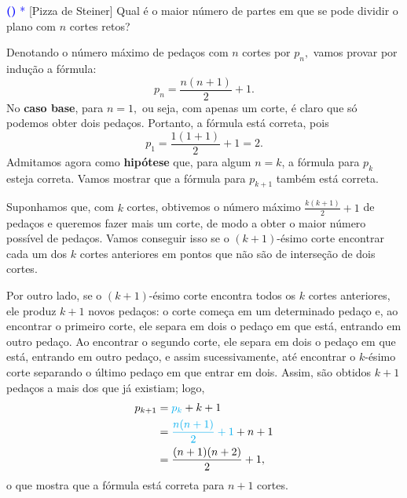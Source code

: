 \documentclass[12pt, a4paper]{article}
\newcounter{exercicio}[section]
\newenvironment{exercicio}[1][]{\refstepcounter{exercicio}\par\medskip
 \textcolor{blue}{\bf(\theexercicio)} \rmfamily}{\medskip }
\begin{document}
\begin{exercicio}\textcolor{Blue}{*} \textsf{[Pizza de Steiner]}
Qual é o maior número de partes em que se pode dividir o plano com $n$ cortes retos?
\end{exercicio}
\begin{solution}
Denotando o número máximo de pedaços com $n$ cortes por $p_n,$
vamos provar por indução a fórmula:
\[
p_n = \dfrac{n(n+1)}{2} + 1.
\]
No \textbf{caso base}, para $n = 1,$ ou seja, com apenas um corte, é claro que só podemos
obter dois pedaços. Portanto, a fórmula está correta, pois
\[
p_1 = \dfrac{1(1+1)}{2} + 1 = 2.
\]
Admitamos agora como \textbf{hipótese} que, para algum $n= k$, a fórmula para $p_k$ esteja correta. Vamos mostrar que a fórmula para $p_{k+1}$ também está correta.

Suponhamos que, com $k$ cortes, obtivemos o número máximo
$\frac{k(k + 1)}{2} + 1$ de pedaços e queremos fazer mais um corte, de modo a obter o maior número possível de pedaços. Vamos conseguir isso se o $(k + 1)$-ésimo corte encontrar cada um dos $k$ cortes anteriores em pontos que não são de interseção de dois cortes. 

Por outro lado, se o $(k+ 1)$-ésimo corte encontra todos os $k$ cortes anteriores, ele produz $k + 1$ novos pedaços: o corte começa em um determinado pedaço e, ao encontrar o primeiro corte, ele separa em dois o pedaço em que está, entrando em outro pedaço. Ao encontrar o segundo corte, ele separa em dois o pedaço em que está, entrando em outro pedaço, e assim sucessivamente, até encontrar o $k$-ésimo corte separando o último pedaço em que entrar em dois. Assim, são obtidos $k + 1$ pedaços a mais dos que já existiam; logo,
\begin{align*}
    p_{k+1} &= \textcolor{Cyan}{p_k} + k + 1 \\&= \textcolor{Cyan}{\dfrac{n(n+1)}{2}+1} + n + 1 \\&= \dfrac{(n+1)(n+2)}{2} + 1,
\end{align*}
o que mostra que a fórmula está correta para $n + 1$ cortes.
\end{solution}
\end{document}
